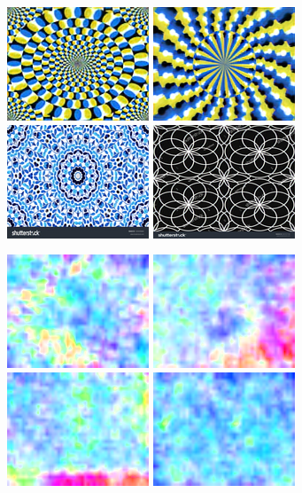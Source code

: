\documentclass[journal]{IEEEtran}
\begin{document}
\begin{figure}
  \includegraphics[width=0.24\linewidth]{fig/rotate-0-7.png}
  \includegraphics[width=0.24\linewidth]{fig/rotate-1-7.png}
  \includegraphics[width=0.24\linewidth]{fig/control-0-7.png}
  \includegraphics[width=0.24\linewidth]{fig/control-1-7.png}

  \includegraphics[width=0.24\linewidth]{fig/rotate-0-flo.png}
  \includegraphics[width=0.24\linewidth]{fig/rotate-1-flo.png}
  \includegraphics[width=0.24\linewidth]{fig/control-0-flo.png}
  \includegraphics[width=0.24\linewidth]{fig/control-1-flo.png}


\end{figure}
\end{document}
